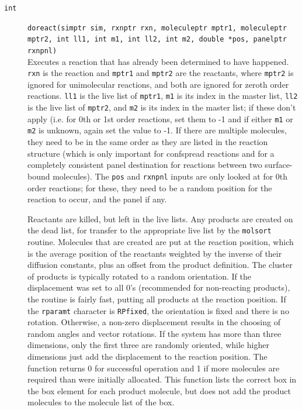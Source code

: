 \documentclass {scrbook}
\newcommand {\ttt} {\texttt}
\begin{document}
\begin{description}
\item[\ttt{int}]
\ttt{doreact(simptr sim, rxnptr rxn, moleculeptr mptr1, moleculeptr mptr2, int ll1, int m1, int ll2, int m2, double *pos, panelptr rxnpnl)} \\
Executes a reaction that has already been determined to have happened. \ttt{rxn} is the reaction and \ttt{mptr1} and \ttt{mptr2} are the reactants, where \ttt{mptr2} is ignored for unimolecular reactions, and both are ignored for zeroth order reactions. \ttt{ll1} is the live list of \ttt{mptr1}, \ttt{m1} is its index in the master list, \ttt{ll2} is the live list of \ttt{mptr2}, and \ttt{m2} is its index in the master list; if these don't apply (i.e. for 0th or 1st order reactions, set them to -1 and if either \ttt{m1} or \ttt{m2} is unknown, again set the value to -1. If there are multiple molecules, they need to be in the same order as they are listed in the reaction structure (which is only important for confspread reactions and for a completely consistent panel destination for reactions between two surface-bound molecules). The \ttt{pos} and \ttt{rxnpnl} inputs are only looked at for 0th order reactions; for these, they need to be a random position for the reaction to occur, and the panel if any.

Reactants are killed, but left in the live lists. Any products are created on the dead list, for transfer to the appropriate live list by the \ttt{molsort} routine. Molecules that are created are put at the reaction position, which is the average position of the reactants weighted by the inverse of their diffusion constants, plus an offset from the product definition. The cluster of products is typically rotated to a random orientation. If the displacement was set to all 0's (recommended for non-reacting products), the routine is fairly fast, putting all products at the reaction position. If the \ttt{rparamt} character is \ttt{RPfixed}, the orientation is fixed and there is no rotation. Otherwise, a non-zero displacement results in the choosing of random angles and vector rotations. If the system has more than three dimensions, only the first three are randomly oriented, while higher dimensions just add the displacement to the reaction position. The function returns 0 for successful operation and 1 if more molecules are required than were initially allocated. This function lists the correct box in the box element for each product molecule, but does not add the product molecules to the molecule list of the box.


\end{description}
\end{document}
